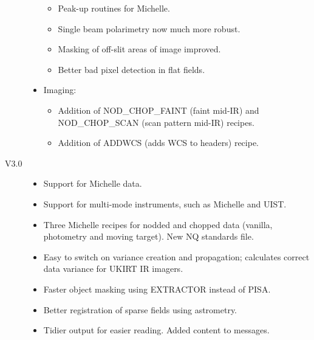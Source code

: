 \documentclass[twoside,11pt,nolof]{starlink}
\begin{document}
\begin{description}
\begin{itemize}
\begin{itemize}
\item Peak-up routines for Michelle.

\item Single beam polarimetry now much more robust.

\item Masking of off-slit areas of image improved.

\item Better bad pixel detection in flat fields.

\end{itemize}

\item Imaging:

\begin{itemize}

\item Addition of NOD\_CHOP\_FAINT (faint mid-IR) and
    NOD\_CHOP\_SCAN (scan pattern mid-IR) recipes.

\item Addition of ADDWCS (adds WCS to headers) recipe.

\end{itemize}

\end{itemize}

\item[V3.0]

\begin{itemize}

\item Support for Michelle data.

\item Support for multi-mode instruments, such as Michelle and UIST.

\item Three Michelle recipes for nodded and chopped data (vanilla,
  photometry and moving target).  New NQ standards file.

\item Easy to switch on variance creation and propagation; calculates
  correct data variance for UKIRT IR imagers.

\item  Faster object masking using EXTRACTOR instead of PISA.

\item Better registration of sparse fields using astrometry.

\item Tidier output for easier reading.  Added content to messages.


\end{itemize}
\end{description}
\end{document}
